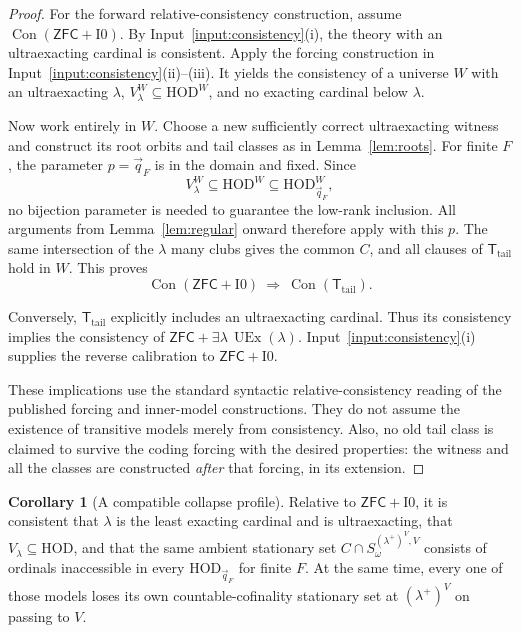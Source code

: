 \documentclass[11pt,letterpaper]{article}
\theoremstyle{definition}
\newtheorem{corollary}[definition]{Corollary}
\numberwithin{equation}{section}
\newcommand{\ZFC}{\mathsf{ZFC}}
\newcommand{\HOD}{\mathrm{HOD}}
\newcommand{\UEx}{\operatorname{UEx}}
\newcommand{\Con}{\operatorname{Con}}
\newcommand{\Izero}{\mathrm{I0}}
\begin{document}
\begin{proof}
For the forward relative-consistency construction, assume $\Con(\ZFC+\Izero)$. By Input~\ref{input:consistency}(i), the theory with an ultraexacting cardinal is consistent. Apply the forcing construction in Input~\ref{input:consistency}(ii)--(iii). It yields the consistency of a universe $W$ with an ultraexacting $\lambda$, $V_\lambda^W\subseteq\HOD^W$, and no exacting cardinal below $\lambda$.

Now work entirely in $W$. Choose a new sufficiently correct ultraexacting witness and construct its root orbits and tail classes as in Lemma~\ref{lem:roots}. For finite $F$, the parameter $p=\vec q_F$ is in the domain and fixed. Since
\[
V_\lambda^W\subseteq\HOD^W\subseteq\HOD_{\vec q_F}^W,
\]
no bijection parameter is needed to guarantee the low-rank inclusion. All arguments from Lemma~\ref{lem:regular} onward therefore apply with this $p$. The same intersection of the $\lambda$ many clubs gives the common $C$, and all clauses of $\mathsf T_{\mathrm{tail}}$ hold in $W$. This proves
\[
\Con(\ZFC+\Izero)\ \Longrightarrow\ \Con(\mathsf T_{\mathrm{tail}}).
\]

Conversely, $\mathsf T_{\mathrm{tail}}$ explicitly includes an ultraexacting cardinal. Thus its consistency implies the consistency of $\ZFC+\exists\lambda\,\UEx(\lambda)$. Input~\ref{input:consistency}(i) supplies the reverse calibration to $\ZFC+\Izero$.

These implications use the standard syntactic relative-consistency reading of the published forcing and inner-model constructions. They do not assume the existence of transitive models merely from consistency. Also, no old tail class is claimed to survive the coding forcing with the desired properties: the witness and all the classes are constructed \emph{after} that forcing, in its extension.
\end{proof}

\begin{corollary}[A compatible collapse profile]\label{cor:profile}
Relative to $\ZFC+\Izero$, it is consistent that $\lambda$ is the least exacting cardinal and is ultraexacting, that $V_\lambda\subseteq\HOD$, and that the same ambient stationary set $C\cap S_\omega^{(\lambda^+)^V,V}$ consists of ordinals inaccessible in every $\HOD_{\vec q_F}$ for finite $F$. At the same time, every one of those models loses its own countable-cofinality stationary set at $(\lambda^+)^V$ on passing to $V$.
\end{corollary}
\end{document}
